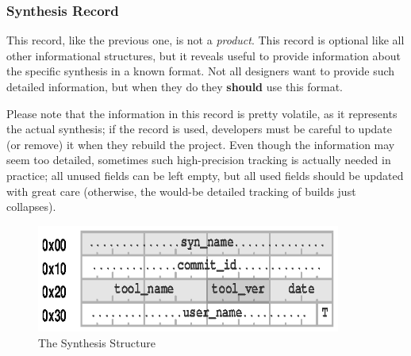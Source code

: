 \documentclass[a4paper, 12pt]{article}
\begin{document}
\pagebreak 

\subsubsection{Synthesis Record}

This record, like the previous one, is not a \textit{product}.
This record is optional like all other informational structures, but it reveals
useful to provide information about the specific synthesis in a known format.
Not all designers want to provide such detailed information, but when they
do they  \textbf{should} use this format.

Please note that the information in this record is pretty volatile, as
it represents the actual synthesis; if the record is used, developers
must be careful to update (or remove) it when they rebuild the
project.  Even though the information may seem too detailed, sometimes
such high-precision tracking is actually needed in practice; all
unused fields can be left empty, but all used fields should be updated
with great care (otherwise, the would-be detailed tracking of builds just collapses).

\begin{figure}[h]
\centering%
\includegraphics[width=100mm]{img/sdb-synthesis.ps}
\caption{The Synthesis Structure}
\label{fig:FigureSynthesis}
\end{figure}
\end{document}
